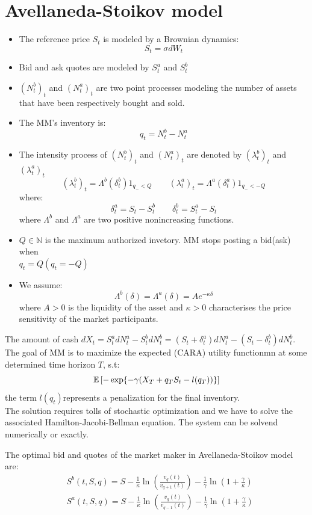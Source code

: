 \section{Avellaneda-Stoikov model}
\begin{mysetting}
\begin{itemize}
	\item 	The reference price $S_t$ is modeled by a Brownian dynamics:
	\[
	S_t = \sigma dW_t
	\]
	\item Bid and ask quotes are modeled by $S_t^a$ and $S_t^b$
	\item $(N_t^b)_t$ and $(N_t^a)_t$ are two point processes modeling the number of assets that have
	been respectively bought and sold.
	\item The MM's inventory is:
	\[
	q_t = N_t^b - N_t^a
	\]
	\item The intensity process of $(N_t^b)_t$ and $(N_t^a)_t$  are denoted by $(\lambda_t^b)_t$ and $(\lambda_t^a)_t$
	\[
	(\lambda_t^b)_t = \Lambda^b (\delta_t^b)1_{q_- < Q} \qquad (\lambda_t^a)_t = \Lambda^a (\delta_t^a)1_{q_- < -Q}
	\]
	where:
	\[
	\delta_t^a = S_t - S_t^b \qquad \delta_t^b = S_t^a - S_t 
	\]
where $\Lambda^b$ and $\Lambda^a$ are two positive nonincreasing functions. 
\item $Q\in \mathbb{N}$ is the maximum authorized invetory. MM stops posting a bid(ask) when \\$q_t =Q(q_t = - Q)$
\item We assume:
\[
\Lambda^b(\delta) = \Lambda^a(\delta)=Ae^{-\kappa\delta}
\]
where $A>0$ is the liquidity of the asset and $\kappa >0$ characterises the price sensitivity of the market participants.
\end{itemize}
\end{mysetting}
The amount of cash $dX_t = S_t^a dN^a_t-S_t^bdN_t^b = (S_t + \delta_t^a)dN_t^a - (S_t - \delta_t^b)dN_t^b $.\\
The goal of MM is to maximize the expected (CARA) utility functionmn at some determined time horizon $T$, s.t:
\[
\mathbb{E}\left[-\exp\{-\gamma(X_T + q_TS_t - l(q_T))\}\right]
\]
the term $l(q_t)$represents a penalization for the final inventory.\\
The solution requires tolls of stochastic optimization and we have to solve the associated Hamilton-Jacobi-Bellman equation. The system can be solvend numerically or exactly.
\newpage
\begin{mytheorem}
	The optimal bid and quotes of the market maker in Avellaneda-Stoikov model are:
	\begin{align*}
		& S^b(t,S,q) = S - \frac{1}{\kappa} \ln \left( \frac{v_q(t)}{v_{q+1}(t)}\right) - \frac{1}{\gamma} \ln\left(1 + \frac{\gamma}{\kappa}\right) \\
		& S^a(t,S,q) = S - \frac{1}{\kappa} \ln \left( \frac{v_q(t)}{v_{q-1}(t)}\right) - \frac{1}{\gamma} \ln\left(1 + \frac{\gamma}{\kappa}\right)
	\end{align*}
\end{mytheorem}
